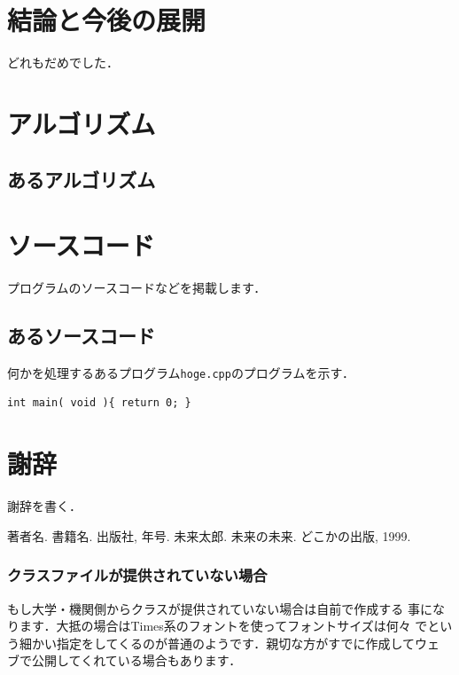 \begin{InTeX}
\chapter{結論と今後の展開}
どれもだめでした．
\begin{appendix}
\chapter{アルゴリズム}
\section{あるアルゴリズム}
\chapter{ソースコード}
プログラムのソースコードなどを掲載します．
\section{あるソースコード}
何かを処理するあるプログラム\texttt{hoge.cpp}のプログラムを示す．
\begin{verbatim}
int main( void ){ return 0; }
\end{verbatim}
\end{appendix}
\chapter*{謝辞}
謝辞を書く．
\begin{thebibliography}{9}
  著者名. 書籍名. 出版社, 年号.
  未来太郎. 未来の未来. どこかの出版, 1999. 
\end{thebibliography}

\end{InTeX}
%

\subsection{クラスファイルが提供されていない場合}

もし大学・機関側からクラスが提供されていない場合は自前で作成する
事になります．大抵の場合はTimes系のフォントを使ってフォントサイズは何々
でという細かい指定をしてくるのが普通のようです．親切な方がすでに作成してウェ
ブで公開してくれている場合もあります．

